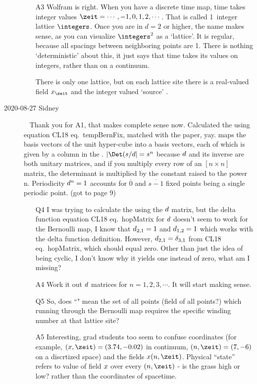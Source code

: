 \begin{description}
\begin{itemize}
  \item[A3]
Wolfram is right. When you have a discrete time map, time takes integer
values $\zeit=\cdots,-1,0,1,2,\cdots$. That is called 1\dmn\ integer lattice
$\integers$. Once you are in $d=2$ or higher, the name makes sense, as
you can visualize $\integers^2$ as a `lattice'. It is regular, because all spacings
between neighboring points are 1. There is nothing `deterministic' about
this, it just says that time takes its values on integers, rather than on a continuum.

There is only one lattice, but on each lattice site there is a
real-valued field $\ssp_\zeit$ and the integer valued `source' \Ssym{\zeit}.
\end{itemize}

\item[2020-08-27 Sidney]~
Thank you for A1, that makes complete sense now. Calculated the {\jacobianOrb}
using equation CL18 eq.~{tempBernFix}, matched with the paper, yay.
{\JacobianOrb} maps the basis vectors of the unit hyper-cube into a
{\fundPip} basis vectors, each of which is given by a
column in the {\jacobianOrb}. $|\Det(s/\shift|=s^n$ because $d$ and
its inverse are both unitary matrices, and if you multiply every row of
an $[n\times{n}]$ matrix, the determinant is multiplied by the constant
raised to the power n. Periodicity $d^n=1$ accounts for
$\overline{0}$ and $\overline{s-1}$ fixed points being a single periodic
point. (got to page 9)

\begin{itemize}
	\item[Q4]
I was trying to calculate the {\jacobianOrb} using the $d$ matrix, but the delta function equation CL18 eq.~{hopMatrix} for $d$ doesn't seem to work for the Bernoulli map, I know that $d_{2,1}=1$ and $d_{1,2}=1$ which works with the delta function definition. However, $d_{2,1}=\delta_{3,1}$ from CL18 eq.~{hopMatrix}, which should equal zero. Other than just the idea of being cyclic, I don't know why it yields one instead of zero, what am I missing?
  \item[A4]
Work it out $d$ matrices for $n=1,2,3,\cdots$. It will start making sense.
	\item[Q5]
So, does ``{\lattstate}" mean the set of all points (field of all points?) which running through the Bernoulli map requires the specific winding number at that lattice site?
  \item[A5]
Interesting, grad students too seem to confuse coordinates (for example,
$(x,\zeit)=(3.74,-0.02)$ in continuum, $(n,\zeit)=(7,-6)$ on a discrtized space)
and the
fields $\ssp(n,\zeit)$. Physical ``state'' refers to value of field $x$
over every $(n,\zeit)$ - is the grass high or low? rather than the coordinates
of spacetime.


\end{itemize}
\end{description}
